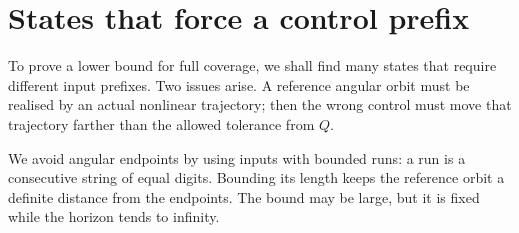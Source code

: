 \documentclass[11pt]{amsart}
\theoremstyle{definition}
\theoremstyle{remark}
\numberwithin{equation}{section}
\begin{document}
\section{States that force a control prefix}\label{sec:shadow}
To prove a lower bound for full coverage, we shall find many states
that require different input prefixes. Two issues arise. A reference
angular orbit must be realised by an actual nonlinear trajectory;
then the wrong control must move that trajectory farther than the
allowed tolerance from $Q$.

We avoid angular endpoints by using inputs with bounded runs:
a run is a consecutive string of equal digits. Bounding its length
keeps the reference orbit a definite distance from the endpoints.
The bound may be large, but it is fixed while the horizon tends
to infinity.
\end{document}
